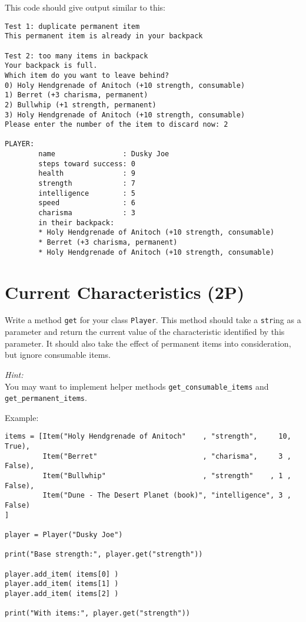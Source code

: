 \documentclass[
	english,
	fontsize=10pt,
	parskip=half,
	titlepage=true,
	DIV=12
]{scrartcl}
\newcommand*{\inPy}[1]{\texttt{#1}}
\begin{document}
This code should give output similar to this:
\begin{verbatim}
Test 1: duplicate permanent item
This permanent item is already in your backpack

Test 2: too many items in backpack
Your backpack is full.
Which item do you want to leave behind?
0) Holy Hendgrenade of Anitoch (+10 strength, consumable)
1) Berret (+3 charisma, permanent)
2) Bullwhip (+1 strength, permanent)
3) Holy Hendgrenade of Anitoch (+10 strength, consumable)
Please enter the number of the item to discard now: 2

PLAYER:
        name                : Dusky Joe
        steps toward success: 0
        health              : 9
        strength            : 7
        intelligence        : 5
        speed               : 6
        charisma            : 3
        in their backpack:
        * Holy Hendgrenade of Anitoch (+10 strength, consumable)
        * Berret (+3 charisma, permanent)
        * Holy Hendgrenade of Anitoch (+10 strength, consumable)
\end{verbatim}


\section{Current Characteristics (2\;P)}
Write a method \texttt{get} for your class \texttt{Player}. This method should take a \inPy{str}ing as a parameter and return the current value of the characteristic identified by this parameter. It should also take the effect of permanent items into consideration, but ignore consumable items.

\emph{Hint:}\\
You may want to implement helper methods \texttt{get\_consumable\_items} and \texttt{get\_permanent\_items}.

Example:
\begin{verbatim}
items = [Item("Holy Hendgrenade of Anitoch"    , "strength",     10, True),
         Item("Berret"                         , "charisma",     3 , False),
         Item("Bullwhip"                       , "strength"    , 1 , False),
         Item("Dune - The Desert Planet (book)", "intelligence", 3 , False)
]

player = Player("Dusky Joe")

print("Base strength:", player.get("strength"))

player.add_item( items[0] )
player.add_item( items[1] )
player.add_item( items[2] )

print("With items:", player.get("strength"))
\end{verbatim}
\end{document}
